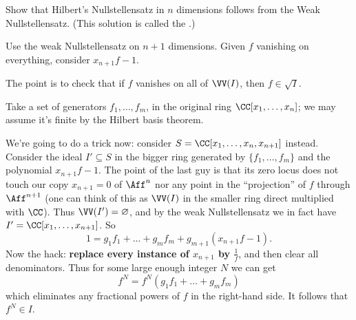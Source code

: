 \begin{problem}
	\yod
	\label{prob:hilbert_from_weak}
	Show that Hilbert's Nullstellensatz in $n$ dimensions
	follows from the Weak Nullstellensatz.
	(This solution is called the .)
	\begin{hint}
		Use the weak Nullstellensatz on $n+1$ dimensions.
		Given $f$ vanishing on everything,
		consider $x_{n+1}f-1$.
	\end{hint}
	\begin{sol}
		The point is to check that if $f$ vanishes on all of $\VV(I)$,
		then $f \in \sqrt I$.

		Take a set of generators $f_1, \dots, f_m$,
		in the original ring $\CC[x_1, \dots, x_n]$;
		we may assume it's finite by the Hilbert basis theorem.

		We're going to do a trick now:
		consider $S = \CC[x_1, \dots, x_n, x_{n+1}]$ instead.
		Consider the ideal $I' \subseteq S$ in the bigger ring
		generated by $\{f_1, \dots, f_m\}$ and the polynomial $x_{n+1} f - 1$.
		The point of the last guy is that its zero locus
		does not touch our copy $x_{n+1}=0$ of $\Aff^n$
		nor any point in the ``projection'' of $f$ through $\Aff^{n+1}$
		(one can think of this as $\VV(I)$ in the smaller ring
		direct multiplied with $\CC$).
		Thus $\VV(I') = \varnothing$, and by the weak Nullstellensatz
		we in fact have $I' = \CC[x_1, \dots, x_{n+1}]$.
		So
		\[ 1 = g_1f_1 + \dots + g_mf_m + g_{m+1} \left( x_{n+1}f-1 \right). \]
		Now the hack: \textbf{replace every instance of $x_{n+1}$ by $\frac 1f$},
		and then clear all denominators.
		Thus for some large enough integer $N$ we can get
		\[ f^N = f^N(g_1f_1 + \dots + g_mf_m) \]
		which eliminates any fractional powers of $f$ in the right-hand side.
		It follows that $f^N \in I$.
	\end{sol}
\end{problem}

